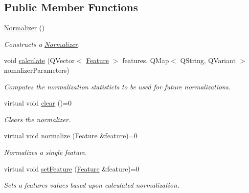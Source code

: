 \subsection*{\-Public \-Member \-Functions}
\begin{DoxyCompactItemize}
\item 
\hypertarget{classhsom_1_1_normalizer_a333d863efb0f68c743e85d6b0f2cda05}{\hyperlink{classhsom_1_1_normalizer_a333d863efb0f68c743e85d6b0f2cda05}{\-Normalizer} ()}\label{classhsom_1_1_normalizer_a333d863efb0f68c743e85d6b0f2cda05}

\begin{DoxyCompactList}\small\item\em \-Constructs a \hyperlink{classhsom_1_1_normalizer}{\-Normalizer}. \end{DoxyCompactList}\item 
void \hyperlink{classhsom_1_1_normalizer_ad033162f2f4d207c170fd97e349dfb65}{calculate} (\-Q\-Vector$<$ \hyperlink{classhsom_1_1_feature}{\-Feature} $>$ features, \-Q\-Map$<$ \-Q\-String, \-Q\-Variant $>$ nomalizer\-Parameters)
\begin{DoxyCompactList}\small\item\em \-Computes the normalization statisticts to be used for future normalizations. \end{DoxyCompactList}\item 
\hypertarget{classhsom_1_1_normalizer_ada54af29a7b7527eb555d267ca82d849}{virtual void \hyperlink{classhsom_1_1_normalizer_ada54af29a7b7527eb555d267ca82d849}{clear} ()=0}\label{classhsom_1_1_normalizer_ada54af29a7b7527eb555d267ca82d849}

\begin{DoxyCompactList}\small\item\em \-Clears the normalizer. \end{DoxyCompactList}\item 
\hypertarget{classhsom_1_1_normalizer_af00cb37e6079f3802b24389fb336debd}{virtual void \hyperlink{classhsom_1_1_normalizer_af00cb37e6079f3802b24389fb336debd}{normalize} (\hyperlink{classhsom_1_1_feature}{\-Feature} \&feature)=0}\label{classhsom_1_1_normalizer_af00cb37e6079f3802b24389fb336debd}

\begin{DoxyCompactList}\small\item\em \-Normalizes a single feature. \end{DoxyCompactList}\item 
\hypertarget{classhsom_1_1_normalizer_afb0c21572e09b44a67c49c4f18d34837}{virtual void \hyperlink{classhsom_1_1_normalizer_afb0c21572e09b44a67c49c4f18d34837}{set\-Feature} (\hyperlink{classhsom_1_1_feature}{\-Feature} \&feature)=0}\label{classhsom_1_1_normalizer_afb0c21572e09b44a67c49c4f18d34837}

\begin{DoxyCompactList}\small\item\em \-Sets a features values based upon calculated normalization. \end{DoxyCompactList}\end{DoxyCompactItemize}
